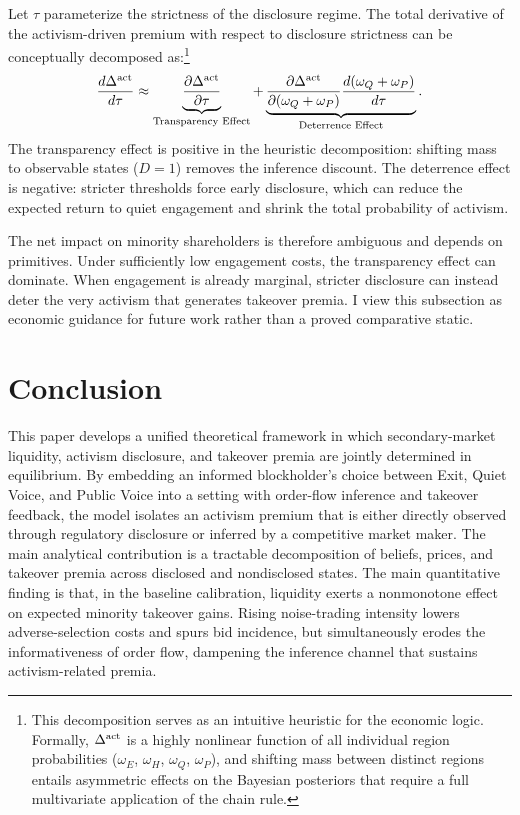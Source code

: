\documentclass[11pt]{article}
\newcommand{\1}{\mathbf{1}}
\begin{document}
Let $\tau$ parameterize the strictness of the disclosure regime. The total derivative of the activism-driven premium with respect to disclosure strictness can be conceptually decomposed as:\footnote{This decomposition serves as an intuitive heuristic for the economic logic. Formally, $\Delta^{\textup{act}}$ is a highly nonlinear function of all individual region probabilities ($\omega_E$, $\omega_H$, $\omega_Q$, $\omega_P$), and shifting mass between distinct regions entails asymmetric effects on the Bayesian posteriors that require a full multivariate application of the chain rule.}
\begin{equation}
\frac{d \Delta^{\textup{act}}}{d \tau} \approx \underbrace{\frac{\partial \Delta^{\textup{act}}}{\partial \tau}}_{\text{Transparency Effect}} + \underbrace{\frac{\partial \Delta^{\textup{act}}}{\partial (\omega_Q + \omega_P)} \frac{d (\omega_Q + \omega_P)}{d \tau}}_{\text{Deterrence Effect}}.
\end{equation}
The transparency effect is positive in the heuristic decomposition: shifting mass to observable states ($D=1$) removes the inference discount. The deterrence effect is negative: stricter thresholds force early disclosure, which can reduce the expected return to quiet engagement and shrink the total probability of activism.

The net impact on minority shareholders is therefore ambiguous and depends on primitives. Under sufficiently low engagement costs, the transparency effect can dominate. When engagement is already marginal, stricter disclosure can instead deter the very activism that generates takeover premia. I view this subsection as economic guidance for future work rather than a proved comparative static.

\section{Conclusion}
\label{sec:conclusion}

This paper develops a unified theoretical framework in which secondary-market liquidity, activism disclosure, and takeover premia are jointly determined in equilibrium. By embedding an informed blockholder's choice between Exit, Quiet Voice, and Public Voice into a setting with order-flow inference and takeover feedback, the model isolates an activism premium that is either directly observed through regulatory disclosure or inferred by a competitive market maker. The main analytical contribution is a tractable decomposition of beliefs, prices, and takeover premia across disclosed and nondisclosed states. The main quantitative finding is that, in the baseline calibration, liquidity exerts a nonmonotone effect on expected minority takeover gains. Rising noise-trading intensity lowers adverse-selection costs and spurs bid incidence, but simultaneously erodes the informativeness of order flow, dampening the inference channel that sustains activism-related premia.
\end{document}
